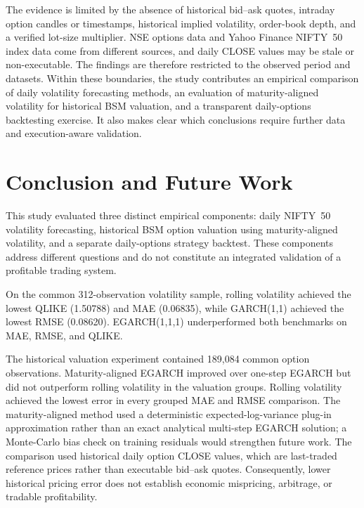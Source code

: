 \documentclass[journal]{IEEEtran}
\begin{document}
The evidence is limited by the absence of historical bid--ask quotes, intraday option candles or timestamps, historical implied volatility, order-book depth, and a verified lot-size multiplier. NSE options data and Yahoo Finance NIFTY~50 index data come from different sources, and daily CLOSE values may be stale or non-executable. The findings are therefore restricted to the observed period and datasets. Within these boundaries, the study contributes an empirical comparison of daily volatility forecasting methods, an evaluation of maturity-aligned volatility for historical BSM valuation, and a transparent daily-options backtesting exercise. It also makes clear which conclusions require further data and execution-aware validation.

\section{Conclusion and Future Work}

This study evaluated three distinct empirical components: daily NIFTY~50 volatility forecasting, historical BSM option valuation using maturity-aligned volatility, and a separate daily-options strategy backtest. These components address different questions and do not constitute an integrated validation of a profitable trading system.

On the common 312-observation volatility sample, rolling volatility achieved the lowest QLIKE (1.50788) and MAE (0.06835), while GARCH(1,1) achieved the lowest RMSE (0.08620). EGARCH(1,1,1) underperformed both benchmarks on MAE, RMSE, and QLIKE. %

The historical valuation experiment contained 189{,}084 common option observations. Maturity-aligned EGARCH improved over one-step EGARCH but did not outperform rolling volatility in the valuation groups. Rolling volatility achieved the lowest error in every grouped MAE and RMSE comparison. %
The maturity-aligned method used a deterministic expected-log-variance plug-in approximation rather than an exact analytical multi-step EGARCH solution; a Monte-Carlo bias check on training residuals would strengthen future work. The comparison used historical daily option CLOSE values, which are last-traded reference prices rather than executable bid--ask quotes. Consequently, lower historical pricing error does not establish economic mispricing, arbitrage, or tradable profitability.
\end{document}
